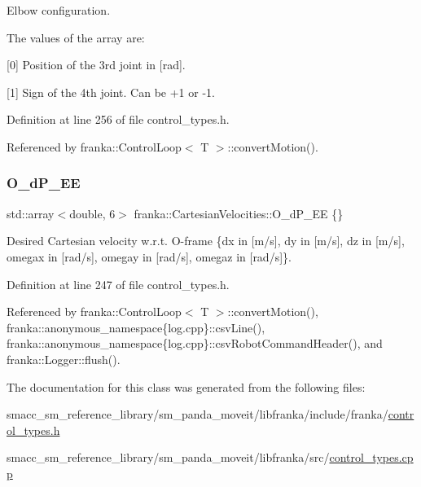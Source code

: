Elbow configuration.

The values of the array are\+:
\begin{DoxyItemize}
\item \mbox{[}0\mbox{]} Position of the 3rd joint in \mbox{[}rad\mbox{]}.
\item \mbox{[}1\mbox{]} Sign of the 4th joint. Can be +1 or -\/1. 
\end{DoxyItemize}

Definition at line 256 of file control\+\_\+types.\+h.



Referenced by franka\+::\+Control\+Loop$<$ T $>$\+::convert\+Motion().

\mbox{\label{classfranka_1_1CartesianVelocities_ab7a42c7c1ee7109025aff5c43a56b398}} 
\subsubsection{\texorpdfstring{O\+\_\+d\+P\+\_\+\+EE}{O\_dP\_EE}}
{\footnotesize\ttfamily std\+::array$<$double, 6$>$ franka\+::\+Cartesian\+Velocities\+::\+O\+\_\+d\+P\+\_\+\+EE \{\}}

Desired Cartesian velocity w.\+r.\+t. O-\/frame \{dx in \mbox{[}m/s\mbox{]}, dy in \mbox{[}m/s\mbox{]}, dz in \mbox{[}m/s\mbox{]}, omegax in \mbox{[}rad/s\mbox{]}, omegay in \mbox{[}rad/s\mbox{]}, omegaz in \mbox{[}rad/s\mbox{]}\}. 

Definition at line 247 of file control\+\_\+types.\+h.



Referenced by franka\+::\+Control\+Loop$<$ T $>$\+::convert\+Motion(), franka\+::anonymous\+\_\+namespace\{log.\+cpp\}\+::csv\+Line(), franka\+::anonymous\+\_\+namespace\{log.\+cpp\}\+::csv\+Robot\+Command\+Header(), and franka\+::\+Logger\+::flush().



The documentation for this class was generated from the following files\+:\begin{DoxyCompactItemize}
\item 
smacc\+\_\+sm\+\_\+reference\+\_\+library/sm\+\_\+panda\+\_\+moveit/libfranka/include/franka/\hyperlink{control__types_8h}{control\+\_\+types.\+h}\item 
smacc\+\_\+sm\+\_\+reference\+\_\+library/sm\+\_\+panda\+\_\+moveit/libfranka/src/\hyperlink{control__types_8cpp}{control\+\_\+types.\+cpp}\end{DoxyCompactItemize}
